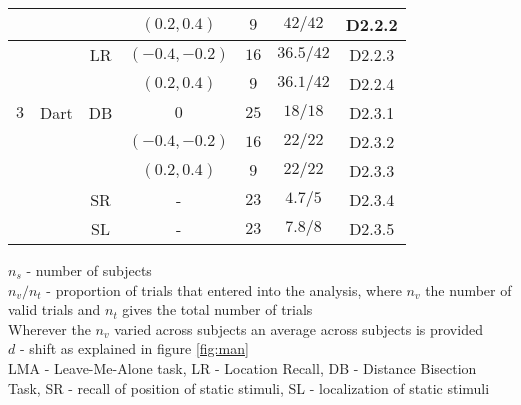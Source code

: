\documentclass[10pt]{article}
\begin{document}
\begin{table}[!ht]
\begin{tabular}{|c|c|c|c|c|c|c|}
\hline
 & & & $(0.2, 0.4)$ & $9$ & $42/42$ & D2.2.2 \\
\hline
 & & LR & $(-0.4,-0.2)$ & $16$ & $36.5/42$ & D2.2.3 \\
\hline
 & & & $(0.2, 0.4)$ & $9$ & $36.1/42$ & D2.2.4 \\
\hline
$3$ & Dart & DB & $0$ & $25$ & $18/18$ & D2.3.1 \\
\hline
 & & & $(-0.4,-0.2)$ & $16$ &$22/22$ & D2.3.2 \\
\hline
 & & & $(0.2, 0.4)$ & $9$ & $22/22$ & D2.3.3 \\
\hline
 & & SR & - & $23$ & $4.7/5$ & D2.3.4 \\
\hline
 & & SL & - & $23$ & $7.8/8$ & D2.3.5 \\
\hline
\end{tabular}
\begin{flushleft} $n_s$ - number of subjects\\ 
$n_v/n_t$ - proportion of trials that entered into the analysis, where $n_v$ the number of valid trials and $n_t$ gives the total number of trials
\\
Wherever the $n_v$ varied across subjects an average across subjects is provided \\
$d$ - shift as explained in figure \ref{fig:man}\\
LMA - Leave-Me-Alone task, LR - Location Recall, DB - Distance Bisection Task, SR - recall of position of static stimuli, SL - localization of static stimuli
\end{flushleft}
\label{tab:data}
\end{table}
\end{document}
